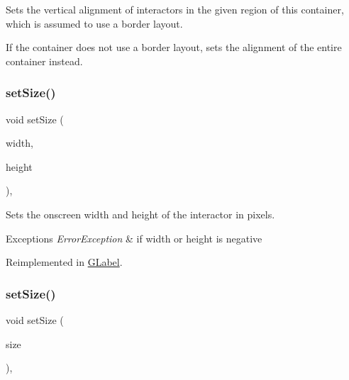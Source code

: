 Sets the vertical alignment of interactors in the given region of this container, which is assumed to use a border layout. 

If the container does not use a border layout, sets the alignment of the entire container instead. \mbox{\label{classsgl_1_1GInteractor_aca25d49481f9bf5fc8f7df4c086c4ce7}} 
\subsubsection{\texorpdfstring{set\+Size()}{setSize()}\hspace{0.1cm}{\footnotesize\ttfamily [1/2]}}
{\footnotesize\ttfamily void set\+Size (\begin{DoxyParamCaption}\item[{double}]{width,  }\item[{double}]{height }\end{DoxyParamCaption})\hspace{0.3cm}{\ttfamily [virtual]}, {\ttfamily [inherited]}}



Sets the onscreen width and height of the interactor in pixels. 


\begin{DoxyExceptions}{Exceptions}
{\em Error\+Exception} & if width or height is negative \\
\hline
\end{DoxyExceptions}


Reimplemented in \mbox{\hyperlink{classsgl_1_1GLabel_a8ba9af72c23f52d4b93096a13a11f150}{G\+Label}}.

\mbox{\label{classsgl_1_1GInteractor_ae2b628228f192c2702c4ce941b2af68f}} 
\subsubsection{\texorpdfstring{set\+Size()}{setSize()}\hspace{0.1cm}{\footnotesize\ttfamily [2/2]}}
{\footnotesize\ttfamily void set\+Size (\begin{DoxyParamCaption}\item[{const \mbox{\hyperlink{structsgl_1_1GDimension}{G\+Dimension}} \&}]{size }\end{DoxyParamCaption})\hspace{0.3cm}{\ttfamily [virtual]}, {\ttfamily [inherited]}}



